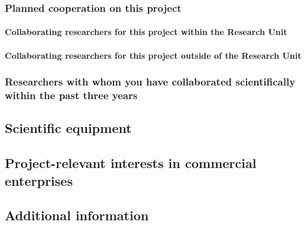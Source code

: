 \documentclass[10pt,fleqn,twoside]{article}
\begin{document}
\subsubsection{Planned cooperation on this project}

\paragraph{Collaborating researchers for this project within the
  Research Unit}


\paragraph{Collaborating researchers for this project outside of
  the Research Unit}



\subsubsection{Researchers with whom you have collaborated scientifically within the past three years}


\subsection{Scientific equipment}

\todo{[Text]}

\subsection{Project-relevant interests in commercial enterprises}

\todo{[Text]}


\subsection{Additional information}

\todo{[Text]}
\end{document}
